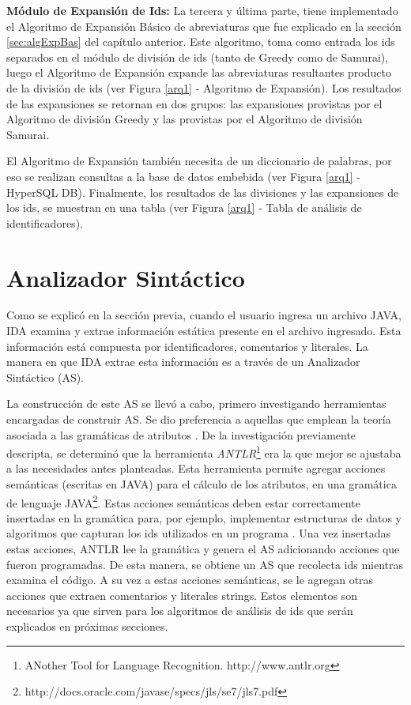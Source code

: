 \textbf{Módulo de Expansión de Ids:} La tercera y última parte, tiene implementado el Algoritmo de Expansión Básico de abreviaturas que fue explicado en la sección \ref{sec:algExpBas} del capítulo anterior.
Este algoritmo, toma como entrada los ids separados en el módulo de división de ids (tanto de Greedy como de Samurai), luego el Algoritmo de Expansión expande las abreviaturas resultantes producto de la división de ids (ver Figura \ref{arq1} - Algoritmo de Expansión). Los resultados de las expansiones se retornan en dos grupos: las expansiones provistas por el Algoritmo de división Greedy y las provistas por el Algoritmo de división Samurai.


El \mbox{Algoritmo} de Expansión también necesita de un diccionario de palabras, por eso se realizan consultas a la base de datos embebida (ver Figura \ref{arq1} - HyperSQL DB). Finalmente, los resultados de las divisiones y las expansiones de los ids, se muestran en una tabla (ver Figura \ref{arq1} - Tabla de análisis de identificadores).

\section{Analizador Sintáctico}

Como se explicó en la sección previa, cuando el usuario ingresa un archivo JAVA, IDA examina y extrae información estática presente en el archivo ingresado. Esta información está compuesta por identificadores, comentarios y literales. La manera en que IDA extrae esta información es a través de un Analizador Sintáctico (AS).

La construcción de este AS se llevó a cabo, primero investigando herramientas encargadas de construir AS. Se dio preferencia a aquellas que emplean la teoría asociada a las gramáticas de atributos \cite{AHUL06}. De la investigación previamente descripta, se determinó que la herramienta \textit{ANTLR}\footnote[1]{ANother Tool for Language Recognition. http://www.antlr.org} era la que mejor se ajustaba a las necesidades antes planteadas. 
Esta herramienta permite agregar acciones semánticas (escritas en JAVA) para el cálculo de los atributos, en una gramática de lenguaje JAVA\footnote[2]{http://docs.oracle.com/javase/specs/jls/se7/jls7.pdf}. Estas acciones semánticas deben estar correctamente insertadas en la gramática para, por ejemplo, implementar estructuras de datos y algoritmos que capturan los ids utilizados en un programa \cite{AAJU83}. Una vez insertadas estas acciones, ANTLR lee la gramática y genera el AS adicionando acciones que fueron programadas. De esta manera, se obtiene un AS que recolecta ids mientras examina el código. A su vez a estas acciones semánticas, se le agregan otras acciones que extraen comentarios y literales strings. Estos elementos son necesarios ya que sirven para los algoritmos de análisis de ids que serán explicados en próximas secciones.

